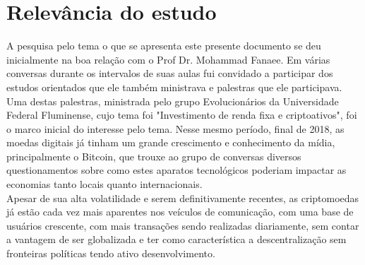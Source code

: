 \section{Relevância do estudo}

A pesquisa pelo tema o que se apresenta este presente documento se deu inicialmente na boa relação com o Prof Dr. Mohammad Fanaee. Em várias conversas durante os intervalos de suas aulas fui convidado a participar dos estudos orientados que ele também ministrava e palestras que ele participava. Uma destas palestras, ministrada pelo grupo  Evolucionários da Universidade Federal Fluminense, cujo tema foi "Investimento de renda fixa e criptoativos", foi o marco inicial do interesse pelo tema. Nesse mesmo período, final de 2018, as moedas digitais já tinham um grande crescimento e conhecimento da mídia, principalmente o Bitcoin, que trouxe ao grupo de conversas diversos questionamentos sobre como estes aparatos tecnológicos poderiam impactar as economias tanto locais quanto internacionais. \\
Apesar de sua alta volatilidade e serem definitivamente recentes, as criptomoedas já estão cada vez mais aparentes nos veículos de comunicação, com uma base de usuários crescente, com mais transações sendo realizadas diariamente, sem contar a vantagem de ser globalizada e ter como característica a descentralização sem fronteiras políticas tendo ativo desenvolvimento. 

 